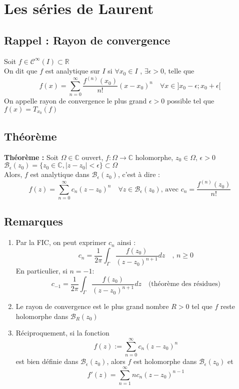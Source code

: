 \section{Les séries de Laurent}
\subsection{Rappel : Rayon de convergence}
Soit $f\in\mathcal{C}^{\infty}(I)\subset\mathbb{R}$\\
On dit que $f$ est analytique sur $I$ si $\forall x_0 \in I$ , $\exists \epsilon > 0$, telle que
$$f(x) = \sum_{n=0}^{\infty}\frac{f^{(n)}(x_0)}{n!}(x-x_0)^n \quad \forall x \in ]x_0-\epsilon;x_0+\epsilon[$$
On appelle rayon de convergence le plus grand $\epsilon > 0$ possible tel que $f(x) = T_{x_0}(f)$

\subsection{Théorème}
\textbf{Théorème :} Soit $\Omega\in\mathbb{C}$ ouvert, $f : \Omega\to\mathbb{C}$ holomorphe, $z_0\in\Omega$, $\epsilon>0$\\
$\mathcal{B}_{\epsilon}(z_0) = \{z_0\in\mathbb{C}, |z-z_0|<\epsilon\}\subset\Omega$\\
Alors, $f$ est analytique dans $\mathcal{B}_\epsilon(z_0)$, c'est à dire :
$$f(z) = \sum_{n=0}^{\infty}c_n(z-z_0)^n \quad \forall z \in \mathcal{B}_\epsilon(z_0) \text{, avec } c_n = \frac{f^{(n)}(z_0)}{n!}$$

\subsection{Remarques}
\begin{enumerate}
    \item Par la FIC, on peut exprimer $c_n$ ainsi :
    $$c_n = \frac{1}{2\pi}\int_{\Gamma}\frac{f(z_0)}{(z-z_0)^{n+1}}dz \quad \text{, }n\geq0$$
    En particulier, si $n=-1 :$
    $$c_{-1}=\frac{1}{2\pi}\int_{\Gamma}\frac{f(z_0)}{(z-z_0)^{n+1}}dz \quad \text{(théorème des résidues)}$$
    \item Le rayon de convergence est le plus grand nombre $R > 0$ tel que $f$ reste holomorphe dans $\mathcal{B}_R(z_0)$
    \item Réciproquement, si la fonction
    $$f(z) := \sum_{n=0}^{\infty}c_n(z-z_0)^n$$
    est bien définie dans $\mathcal{B}_\epsilon(z_0)$, alors $f$ est holomorphe dans $\mathcal{B}_\epsilon(z_0)$ et
    $$f'(z) = \sum_{n=1}^{\infty}nc_n(z-z_0)^{n-1}$$
\end{enumerate}

